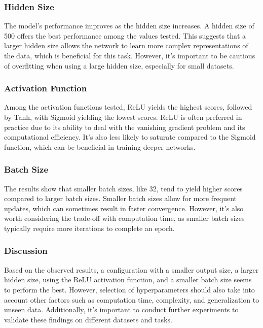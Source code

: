 \subsubsection{Hidden Size}

The model's performance improves as the hidden size increases. A hidden size of 500 offers the best performance among the values tested. This suggests that a larger hidden size allows the network to learn more complex representations of the data, which is beneficial for this task. However, it's important to be cautious of overfitting when using a large hidden size, especially for small datasets.

\subsubsection{Activation Function}

Among the activation functions tested, ReLU yields the highest scores, followed by Tanh, with Sigmoid yielding the lowest scores. ReLU is often preferred in practice due to its ability to deal with the vanishing gradient problem and its computational efficiency. It's also less likely to saturate compared to the Sigmoid function, which can be beneficial in training deeper networks.

\subsubsection{Batch Size}

The results show that smaller batch sizes, like 32, tend to yield higher scores compared to larger batch sizes. Smaller batch sizes allow for more frequent updates, which can sometimes result in faster convergence. However, it's also worth considering the trade-off with computation time, as smaller batch sizes typically require more iterations to complete an epoch.

\subsubsection{Discussion}

Based on the observed results, a configuration with a smaller output size, a larger hidden size, using the ReLU activation function, and a smaller batch size seems to perform the best. However, selection of hyperparameters should also take into account other factors such as computation time, complexity, and generalization to unseen data. Additionally, it's important to conduct further experiments to validate these findings on different datasets and tasks.


